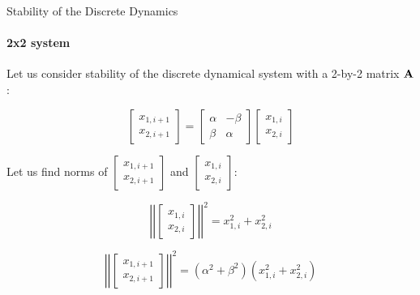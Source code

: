 \documentclass{beamer}
\begin{document}
\begin{frame}{Stability of the Discrete Dynamics}
	\framesubtitle{2x2 system}
	\begin{flushleft}
		
		Let us consider stability of the discrete dynamical system with a 2-by-2 matrix $\mathbf{A}$:
		
		\begin{equation}
			\begin{bmatrix}
				x_{1, i+1} \\ x_{2, i+1}
			\end{bmatrix}
			= 
			\begin{bmatrix}
				\alpha & -\beta \\ \beta & \alpha
			\end{bmatrix}     
			\begin{bmatrix}
				x_{1, i} \\ x_{2, i}
			\end{bmatrix}
		\end{equation}	
		
		Let us find norms of $\begin{bmatrix}
			x_{1, i+1} \\ x_{2, i+1}
		\end{bmatrix}$ and $\begin{bmatrix}
		x_{1, i} \\ x_{2, i}
	\end{bmatrix}$:


		\begin{equation}
		\left | \left|
		\begin{bmatrix}
			x_{1, i} \\ x_{2, i}
		\end{bmatrix}
		\right | \right|^2
			= 
	 	x_{1, i}^2 + x_{2, i}^2
		\end{equation}

		\begin{equation}
			\left | \left|
			\begin{bmatrix}
				x_{1, i+1} \\ x_{2, i+1}
			\end{bmatrix}
			\right | \right|^2
			= 
			(\alpha^2 + \beta^2) (x_{1, i}^2 + x_{2, i}^2)
		\end{equation}
		
		
	\end{flushleft}
\end{frame}
\end{document}

